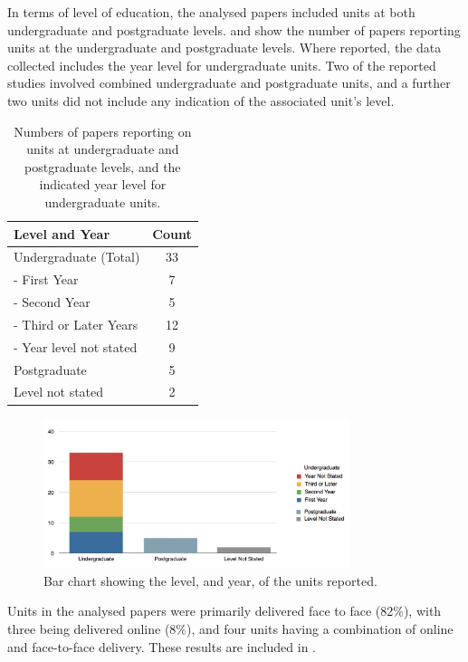 In terms of level of education, the analysed papers included units at both undergraduate and postgraduate levels.  and  show the number of papers reporting units at the undergraduate and postgraduate levels. Where reported, the data collected includes the year level for undergraduate units. Two of the reported studies involved combined undergraduate and postgraduate units, and a further two units did not include any indication of the associated unit's level.

\begin{table}[p]
	\centering
	\caption{Numbers of papers reporting on units at undergraduate and postgraduate levels, and the indicated year level for undergraduate units.}
	\label{tbl:year_level}
	\footnotesize
    \begin{tabular}{lc}
    \textbf{Level and Year} & \textbf{Count} \\ \hline
		Undergraduate (Total)	 & 33 \\
		- First Year & 	7 \\
		- Second Year & 	5 \\
		- Third or Later Years	 & 12 \\
		- Year level not stated & 	9 \\
		Postgraduate & 	5 \\
		Level not stated & 2 \\
    \end{tabular}
\end{table}

\begin{figure}[htbp]
	\centering
	\includegraphics[width=0.8\textwidth]{LevelAndYear}
	\caption{Bar chart showing the level, and year, of the units reported.}
	\label{fig:year_level}
\end{figure}

Units in the analysed papers were primarily delivered face to face (82\%), with three being delivered online (8\%), and four units having a combination of online and face-to-face delivery. These results are included in .

